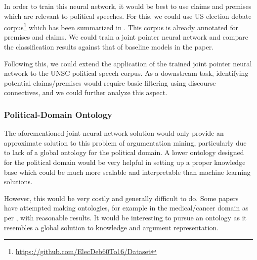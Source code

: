 \documentclass[12pt,a4paper]{article}
\begin{document}
In order to train this neural network, it would be best to use claims and
premises which are relevant to political speeches. For this, we could use US
election debate corpus\footnote{\url{https://github.com/ElecDeb60To16/Dataset}}
which has been summarized in \citet{haddadan-etal-2019-yes}. This corpus is
already annotated for premises and claims. We could train a joint pointer neural
network and compare the classification results against that of baseline models
in the paper.

Following this, we could extend the application of the trained joint pointer
neural network to the UNSC political speech corpus. As a downstream task,
identifying potential claims/premises would require basic filtering using
discourse connectives, and we could further analyze this aspect.

\subsubsection{Political-Domain Ontology}

The aforementioned joint neural network solution would only provide an
approximate solution to this problem of argumentation mining, particularly due to
lack of a global ontology for the political domain. A lower ontology designed for the political domain would be very helpful in setting up a proper knowledge base which could be much more scalable and interpretable than machine learning solutions.

However, this would be very costly and generally difficult to do. Some papers
have attempted making ontologies, for example in the medical/cancer domain as
per \citet{ontology}, with reasonable results. It would be interesting to
pursue an ontology as it resembles a global solution to knowledge and argument representation. 

\newpage


\nocite{*}
\end{document}
